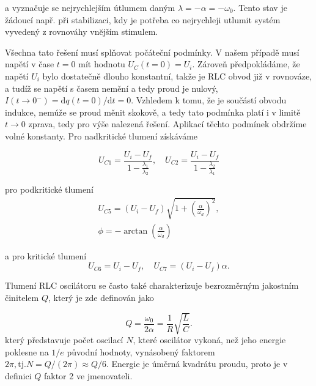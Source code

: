 \documentclass[czech,11pt,a4paper]{article}
\begin{document}
\begin{multicols}{2}
		a vyznačuje se nejrychlejším útlumem daným $\lambda=-\alpha=-\omega_{0}$. Tento stav je žádoucí např. při stabilizaci, kdy je potřeba co nejrychleji utlumit systém vyvedený z rovnováhy vnĕjším stimulem.
		
		Všechna tato řešení musí splňovat počáteční podmínky. V našem případě musí napětí v čase $t=0$ mít hodnotu $U_{C}(t=0)=U_{i}$. Zároveň předpokládáme, že napětí $U_{i}$ bylo dostatečně dlouho konstantní, takže je RLC obvod již v rovnováze, a tudíž se napětí s časem nemění a tedy proud je nulový, $I\left(t \rightarrow 0^{-}\right)=\mathrm{d} q(t=0) / \mathrm{d} t=0$. Vzhledem k tomu, že je součástí obvodu indukce, nemúže se proud měnit skokově, a tedy tato podmínka platí i v limitě $t \rightarrow 0$ zprava, tedy pro výše nalezená řešení. Aplikací těchto podmínek obdržíme volné konstanty. Pro nadkritické tlumení získáváme
		
	\begin{equation}
			U_{C 1}=\frac{U_{i}-U_{f}}{1-\frac{\lambda_{1}}{\lambda_{2}}}, \quad U_{C 2}=\frac{U_{i}-U_{f}}{1-\frac{\lambda_{2}}{\lambda_{1}}}
	\end{equation}
		
		pro podkritické tlumení
		\begin{gather}
			U_{C 5}=\left(U_{i}-U_{f}\right) \sqrt{1+\left(\frac{\alpha}{\omega_{d}}\right)^{2}}, \\ \phi=-\arctan \left(\frac{\alpha}{\omega_{d}}\right)
		\end{gather}
		
		a pro kritické tlumení
\begin{equation}
			U_{C 6}=U_{i}-U_{f}, \quad U_{C 7}=\left(U_{i}-U_{f}\right) \alpha .
\end{equation}
		
		Tlumení RLC oscilátoru se často také charakterizuje bezrozměrným jakostním činitelem $Q$, který je zde definován jako
		
\begin{equation}
			Q=\frac{\omega_{0}}{2 \alpha}=\frac{1}{R} \sqrt{\frac{L}{C}}.			
\end{equation}		
		který představuje počet oscilací $N$, které oscilátor vykoná, než jeho energie poklesne na $1 / e$ původní hodnoty, vynásobený faktorem $2 \pi, \mathrm{tj} . N=Q /(2 \pi) \approx Q / 6$. Energie je úměrná kvadrátu proudu, proto je v definici $Q$ faktor 2 ve jmenovateli.

\end{multicols}
\end{document}
